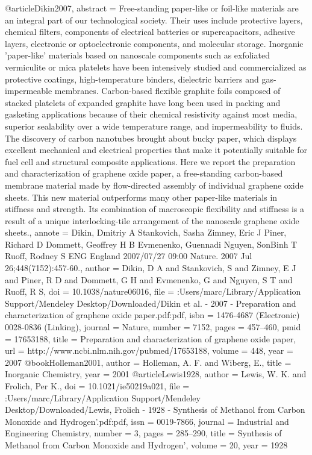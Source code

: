 @article{Dikin2007,
abstract = {Free-standing paper-like or foil-like materials are an integral part of our technological society. Their uses include protective layers, chemical filters, components of electrical batteries or supercapacitors, adhesive layers, electronic or optoelectronic components, and molecular storage. Inorganic 'paper-like' materials based on nanoscale components such as exfoliated vermiculite or mica platelets have been intensively studied and commercialized as protective coatings, high-temperature binders, dielectric barriers and gas-impermeable membranes. Carbon-based flexible graphite foils composed of stacked platelets of expanded graphite have long been used in packing and gasketing applications because of their chemical resistivity against most media, superior sealability over a wide temperature range, and impermeability to fluids. The discovery of carbon nanotubes brought about bucky paper, which displays excellent mechanical and electrical properties that make it potentially suitable for fuel cell and structural composite applications. Here we report the preparation and characterization of graphene oxide paper, a free-standing carbon-based membrane material made by flow-directed assembly of individual graphene oxide sheets. This new material outperforms many other paper-like materials in stiffness and strength. Its combination of macroscopic flexibility and stiffness is a result of a unique interlocking-tile arrangement of the nanoscale graphene oxide sheets.},
annote = {Dikin, Dmitriy A
Stankovich, Sasha
Zimney, Eric J
Piner, Richard D
Dommett, Geoffrey H B
Evmenenko, Guennadi
Nguyen, SonBinh T
Ruoff, Rodney S
ENG
England
2007/07/27 09:00
Nature. 2007 Jul 26;448(7152):457-60.},
author = {Dikin, D A and Stankovich, S and Zimney, E J and Piner, R D and Dommett, G H and Evmenenko, G and Nguyen, S T and Ruoff, R S},
doi = {10.1038/nature06016},
file = {:Users/marc/Library/Application Support/Mendeley Desktop/Downloaded/Dikin et al. - 2007 - Preparation and characterization of graphene oxide paper.pdf:pdf},
isbn = {1476-4687 (Electronic)
0028-0836 (Linking)},
journal = {Nature},
number = {7152},
pages = {457--460},
pmid = {17653188},
title = {{Preparation and characterization of graphene oxide paper}},
url = {http://www.ncbi.nlm.nih.gov/pubmed/17653188},
volume = {448},
year = {2007}
}
@book{Holleman2001,
author = {Holleman, A. F. and Wiberg, E.},
title = {{Inorganic Chemistry}},
year = {2001}
}
@article{Lewis1928,
author = {Lewis, W. K. and Frolich, Per K.},
doi = {10.1021/ie50219a021},
file = {:Users/marc/Library/Application Support/Mendeley Desktop/Downloaded/Lewis, Frolich - 1928 - Synthesis of Methanol from Carbon Monoxide and Hydrogen'.pdf:pdf},
issn = {0019-7866},
journal = {Industrial and Engineering Chemistry},
number = {3},
pages = {285--290},
title = {{Synthesis of Methanol from Carbon Monoxide and Hydrogen'}},
volume = {20},
year = {1928}
}
